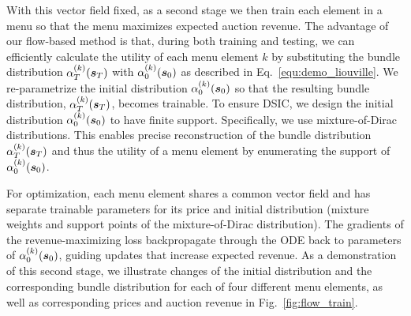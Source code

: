 With this vector field fixed, as a second stage we then train each element in a menu so that the menu maximizes expected auction revenue.  The advantage of our flow-based method is that, during both training and testing, we can efficiently calculate the utility of each menu element $k$ by substituting the bundle distribution $\alpha_T^{(k)}({\bm{s}}_T)$ with $\alpha_0^{(k)}({\bm{s}}_0)$ as described in Eq.~\ref{equ:demo_liouville}.
We re-parametrize the initial distribution $\alpha_0^{(k)}({\bm{s}}_0)$ so that the resulting bundle distribution, $\alpha_T^{(k)}({\bm{s}}_T)$, becomes trainable.
To ensure DSIC, we design the initial distribution $\alpha^{(k)}_0({\bm{s}}_0)$ to have finite support. Specifically, we use mixture-of-Dirac distributions.
This enables precise reconstruction of the bundle distribution $\alpha_T^{(k)}({\bm{s}}_T)$ and thus the utility of a menu element by enumerating the support of $\alpha_0^{(k)}({\bm{s}}_0)$.

For optimization, each menu element shares a common vector field and has separate trainable parameters for its price and  initial distribution (mixture weights and support points of the mixture-of-Dirac distribution).  
The gradients of the revenue-maximizing loss backpropagate through the ODE back to parameters of $\alpha_0^{(k)}({\bm{s}}_0)$, guiding updates that increase expected revenue. 
As a demonstration of  this second stage, we illustrate changes of the initial distribution and the corresponding bundle  distribution for each of four different menu elements, as well as corresponding prices and auction revenue in Fig.~\ref{fig:flow_train}. 


